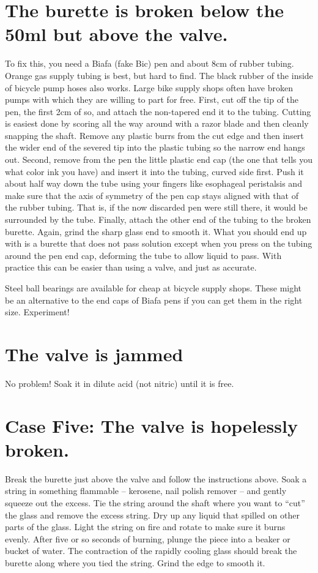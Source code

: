 \section{The burette is broken below the 50ml but above the valve.}
To fix this, 
you need a Biafa (fake Bic) pen and about 8cm of rubber tubing. 
Orange gas supply tubing is best, 
but hard to find. 
The black rubber of the inside of bicycle pump hoses also works. 
Large bike supply shops often have broken pumps 
with which they are willing to part for free. 
First, 
cut off the tip of the pen, 
the first 2cm of so, 
and attach the non-tapered end it to the tubing. 
Cutting is easiest done by scoring all the way around 
with a razor blade and then cleanly snapping the shaft. 
Remove any plastic burrs from the cut edge 
and then insert the wider end of the severed tip 
into the plastic tubing so the narrow end hangs out. 
Second, 
remove from the pen the little plastic end cap 
(the one that tells you what color ink you have) 
and insert it into the tubing, 
curved side first. 
Push it about half way down the tube using your 
fingers like esophageal peristalsis and make sure that 
the axis of symmetry of the pen cap stays aligned 
with that of the rubber tubing. 
That is, 
if the now discarded pen were still there, 
it would be surrounded by the tube. 
Finally, 
attach the other end of the tubing to the broken burette. 
Again, 
grind the sharp glass end to smooth it. 
What you should end up with is a burette that does not pass solution 
except when you press on the tubing around the pen end cap, 
deforming the tube to allow liquid to pass. 
With practice this can be easier than using a valve, 
and just as accurate.

Steel ball bearings are available for cheap at bicycle supply shops. 
These might be an alternative to the end caps of Biafa pens 
if you can get them in the right size. 
Experiment!

\section{The valve is jammed}
No problem! Soak it in dilute acid (not nitric) until it is free.

\section{Case Five: The valve is hopelessly broken.}
Break the burette just above the valve and follow the instructions above. 
Soak a string in something flammable – kerosene, 
nail polish remover – and gently squeeze out the excess. 
Tie the string around the shaft where 
you want to “cut” the glass and remove the excess string. 
Dry up any liquid that spilled on other parts of the glass. 
Light the string on fire and rotate to make sure it burns evenly. 
After five or so seconds of burning, 
plunge the piece into a beaker or bucket of water. 
The contraction of the rapidly cooling glass 
should break the burette along where you tied the string. 
Grind the edge to smooth it.

